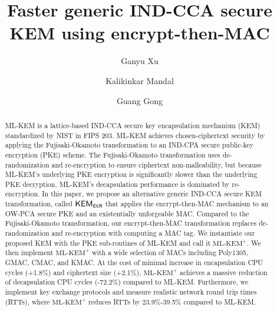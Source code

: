 \documentclass[journal=tches,submission]{iacrtrans}
\author{
    Ganyu Xu\inst{1}
    \and Kalikinkar Mandal\inst{2}
    \and Guang Gong\inst{1}
}
\institute{
  University of Waterloo, Waterloo, Canada, \email{{g66xu,ggong}@uwaterloo.ca}
  \and
  University of New Brunswick, New Brunswick, Canada, \email{kmandal@unb.ca}
}
\title{Faster generic IND-CCA secure KEM using encrypt-then-MAC}
\def\mlkemplus{\text{ML-KEM}^+}
\begin{document}
\maketitle




\begin{abstract}
    ML-KEM is a lattice-based IND-CCA secure key encapsulation mechanism (KEM) standardized by NIST in FIPS 203. ML-KEM achieves chosen-ciphertext security by applying the Fujisaki-Okamoto transformation to an IND-CPA secure public-key encryption (PKE) scheme. The Fujisaki-Okamoto transformation uses de-randomization and re-encryption to ensure ciphertext non-malleability, but because ML-KEM's underlying PKE encryption is significantly slower than the underlying PKE decryption, ML-KEM's decapsulation performance is dominated by re-encryption. In this paper, we propose an alternative generic IND-CCA secure KEM transformation, called ${\sf KEM}_{{\tt EtM}}$ that applies the encrypt-then-MAC mechanism to an OW-PCA secure PKE and an existentially unforgeable MAC. Compared to the Fujisaki-Okamoto transformation, our encrypt-then-MAC transformation replaces de-randomization and re-encryption with computing a MAC tag. 
    We instantiate our proposed KEM with the PKE sub-routines of ML-KEM and call it $\mlkemplus$. We then implement $\mlkemplus$ with 
    a wide selection of MACs including Poly1305, GMAC, CMAC, and KMAC. At the cost of minimal increase in encapsulation CPU cycles (+1.8\%) and ciphertext size (+2.1\%), $\mlkemplus$ achieves a massive reduction of decapsulation CPU cycles (-72.2\%) compared to ML-KEM. Furthermore, we implement key exchange protocols and measure realistic network round trip times (RTTs), where $\mlkemplus$ reduces RTTs by 23.9\%-39.5\% compared to ML-KEM.
\end{abstract}
\end{document}
